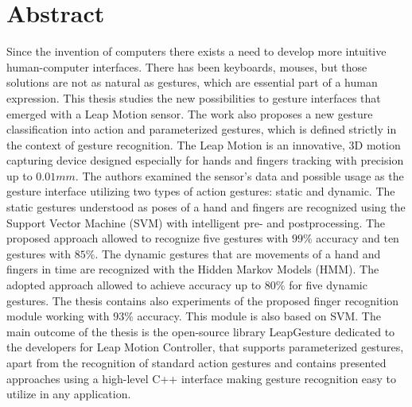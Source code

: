 \chapter{Abstract}
Since the invention of computers there exists a need to develop more intuitive human-computer interfaces.
There has been keyboards, mouses, but those solutions are not as natural as gestures, which are essential part of a human expression.
This thesis studies the new possibilities to gesture interfaces that emerged with a Leap Motion sensor.
The work also proposes a new gesture classification into action and parameterized gestures, which is defined strictly in the context of gesture recognition.
The Leap Motion is an innovative, 3D motion capturing device designed especially for hands and fingers tracking with precision up to $0.01mm$.
The authors examined the sensor's data and possible usage as the gesture interface utilizing two types of action gestures: static and dynamic.
The static gestures understood as poses of a hand and fingers are recognized using the Support Vector Machine (SVM) with intelligent pre- and postprocessing.
The proposed approach allowed to recognize five gestures with $99\%$ accuracy and ten gestures with $85\%$.
The dynamic gestures that are movements of a hand and fingers in time are recognized with the Hidden Markov Models (HMM). 
The adopted approach allowed to achieve accuracy up to $80\%$ for five dynamic gestures.
The thesis contains also experiments of the proposed finger recognition module working with $93\%$ accuracy. This module is also based on SVM.
The main outcome of the thesis is the open-source library LeapGesture dedicated to the developers for Leap Motion Controller, that supports parameterized gestures, apart from the recognition of standard action gestures and contains presented approaches using a high-level C++ interface making gesture recognition easy to utilize in any application.